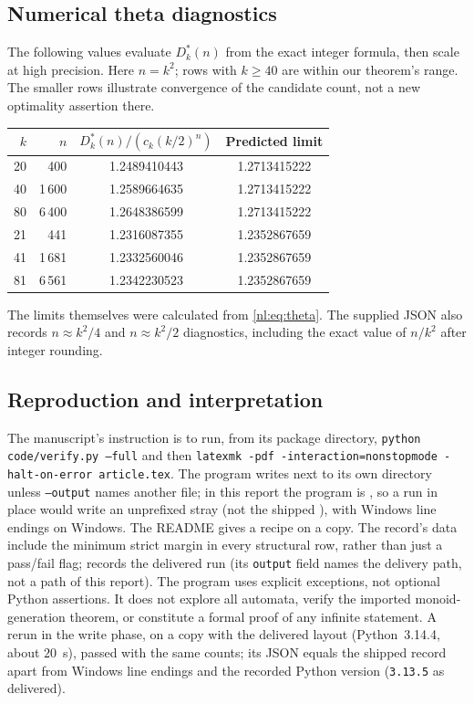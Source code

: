 \documentclass[11pt,a4paper]{article}
\numberwithin{equation}{section}
\theoremstyle{definition}
\theoremstyle{remark}
\begin{document}
\subsection{Numerical theta diagnostics}
The following values evaluate $D^*_k(n)$ from the exact integer formula,
then scale at high precision. Here $n=k^2$; rows with $k\ge40$ are within
our theorem's range. The smaller rows illustrate convergence of the
candidate count, not a new optimality assertion there.
\begin{center}
\begin{tabular}{@{}rrcc@{}}
\toprule
$k$ & $n$ & $D^*_k(n)/(c_k(k/2)^n)$ & Predicted limit\\\midrule
20&400&1.2489410443&1.2713415222\\
40&1\,600&1.2589664635&1.2713415222\\
80&6\,400&1.2648386599&1.2713415222\\
21&441&1.2316087355&1.2352867659\\
41&1\,681&1.2332560046&1.2352867659\\
81&6\,561&1.2342230523&1.2352867659\\
\bottomrule
\end{tabular}
\end{center}
The limits themselves were calculated from \eqref{nl:eq:theta}. The supplied
JSON also records $n\approx k^2/4$ and $n\approx k^2/2$ diagnostics,
including the exact value of $n/k^2$ after integer rounding.

\subsection{Reproduction and interpretation}\label{nl:sec:reproduction}
The manuscript's instruction is to run, from its package directory,
\texttt{python code/verify.py --full} and then
\texttt{latexmk -pdf -interaction=nonstopmode -halt-on-error article.tex}.
The program writes  next to its own
 directory unless \texttt{--output} names another file; in this
report the program is , so a run in
place would write an unprefixed stray 
(not the shipped ), with
Windows line endings on Windows. The README gives a recipe on a copy.
The record's data include the minimum strict margin in every structural
row, rather than just a pass/fail flag; 
records the delivered run (its \texttt{output} field names the delivery
path, not a path of this report). The program uses explicit exceptions,
not optional Python assertions. It does not explore all automata, verify
the imported monoid-generation theorem, or constitute a formal proof of
any infinite statement. A rerun in the write phase, on a copy with the
delivered layout (Python~3.14.4, about $20$~s), passed with the same counts;
its JSON equals the shipped record apart from Windows line endings and the
recorded Python version (\texttt{3.13.5} as delivered).
\end{document}
